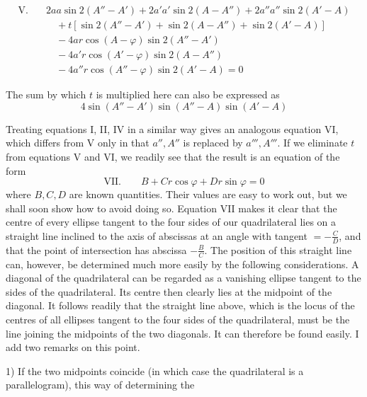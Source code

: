 %
\[
\begin{aligned}
\mathrm{V.}\quad&2aa\sin2(A''-A')+2a'a'\sin2(A-A'')+2a''a''\sin2(A'-A)\\
&\quad+t[\sin2(A''-A')+\sin2(A-A'')+\sin2(A'-A)]\\
&\quad-4ar\cos(A-\varphi)\sin2(A''-A')\\
&\quad-4a'r\cos(A'-\varphi)\sin2(A-A'')\\
&\quad-4a''r\cos(A''-\varphi)\sin2(A'-A)=0
\end{aligned}
\]
\par
The sum by which \(t\) is multiplied here can also be expressed as
\[
4\sin(A''-A')\sin(A''-A)\sin(A'-A)
\]

Treating equations I, II, IV in a similar way gives an analogous equation VI, which differs from V only in that \(a'',A''\) is replaced by \(a''',A'''\). If we eliminate \(t\) from equations V and VI, we readily see that the result is an equation of the form
\[
\mathrm{VII.}\qquad B+Cr\cos\varphi+Dr\sin\varphi=0
\]
where \(B,C,D\) are known quantities. Their values are easy to work out, but we shall soon show how to avoid doing so. Equation VII makes it clear that the centre of every ellipse tangent to the four sides of our quadrilateral lies on a straight line inclined to the axis of abscissas at an angle with tangent \(=-\frac{C}{D}\), and that the point of intersection has abscissa \(-\frac{B}{C}\). The position of this straight line can, however, be determined much more easily by the following considerations. A diagonal of the quadrilateral can be regarded as a vanishing ellipse tangent to the sides of the quadrilateral. Its centre then clearly lies at the midpoint of the diagonal. It follows readily that the straight line above, which is the locus of the centres of all ellipses tangent to the four sides of the quadrilateral, must be the line joining the midpoints of the two diagonals. It can therefore be found easily. I add two remarks on this point.

1) If the two midpoints coincide (in which case the quadrilateral is a parallelogram), this way of determining the
